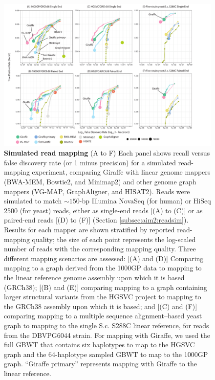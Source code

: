 \documentclass[11pt]{ucscthesis}
\begin{document}
\begin{figure}
    \centering
    \includegraphics[width=\linewidth]{aim2_fig2.pdf}
    \caption[Short read simulated read mapping]{\textbf{Simulated read mapping} (A to F) Each panel shows recall versus false discovery rate (or 1 minus precision) for a simulated read-mapping experiment, comparing Giraffe with linear genome mappers (BWA-MEM, Bowtie2, and Minimap2) and other genome graph mappers (VG-MAP, GraphAligner, and HISAT2). Reads were simulated to match $\sim150$-bp Illumina NovaSeq (for human) or HiSeq 2500 (for yeast) reads, either as single-end reads [(A) to (C)] or as paired-end reads [(D) to (F)] (Section \ref{subsec:aim2:readsim}). Results for each mapper are shown stratified by reported read-mapping quality; the size of each point represents the log-scaled number of reads with the corresponding mapping quality. Three different mapping scenarios are assessed: [(A) and (D)] Comparing mapping to a graph derived from the 1000GP data to mapping to the linear reference genome assembly upon which it is based (GRCh38); [(B) and (E)] comparing mapping to a graph containing larger structural variants from the HGSVC project to mapping to the GRCh38 assembly upon which it is based; and [(C) and (F)] comparing mapping to a multiple sequence alignment–based yeast graph to mapping to the single S.c. S288C linear reference, for reads from the DBVPG6044 strain. For mapping with Giraffe, we used the full GBWT that contains six haplotypes to map to the HGSVC graph and the 64-haplotype sampled GBWT to map to the 1000GP graph. “Giraffe primary” represents mapping with Giraffe to the linear reference.}
    \label{fig:aim2_fig2}
\end{figure}
\end{document}
